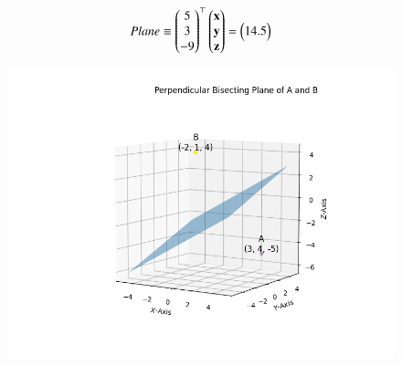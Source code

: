 \documentclass[journal]{IEEEtran}
\begin{document}
	\begin{align}
		Plane \equiv \begin{pmatrix}5 \\ 3 \\ -9\end{pmatrix}^\top\begin{pmatrix}\mathbf{x} \\ \mathbf{y} \\ \mathbf{z}\end{pmatrix}= \begin{pmatrix}14.5\end{pmatrix}
	\end{align}    
	
	
	\begin{figure}[h]
		\centering
		\includegraphics[width=0.7\linewidth]{figs/fig1.png}
		\caption{}
		\label{graph}
	\end{figure}
	
	
	
\end{document}
